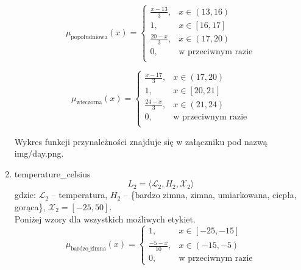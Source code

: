 \documentclass{article}
\begin{document}
\begin{enumerate}
        \begin{equation}
            \mu_{\text{popołudniowa}}(x) =
            \begin{cases}
            \frac{x - 13}{3}, & x \in (13, 16) \\
            1, & x \in [16, 17] \\
            \frac{20 - x}{3}, & x \in (17, 20) \\
            0, & \text{w przeciwnym razie} \\
             \end{cases}
        \end{equation}

        \begin{equation}
            \mu_{\text{wieczorna}}(x) =
            \begin{cases}
            \frac{x - 17}{3}, & x \in (17, 20) \\
            1, & x \in [20, 21] \\
            \frac{24 - x}{3}, & x \in (21, 24) \\
            0, & \text{w przeciwnym razie} \\
            \end{cases}
        \end{equation} 
        
Wykres funkcji przynależności znajduje się w załączniku pod nazwą img/day.png.
    
    \item temperature\_celsius
        \begin{equation}
            L_2 = \langle \mathcal{L}_2, H_2, \mathcal{X}_2 \rangle
        \end{equation}
        gdzie: $\mathcal{L}_2$ – temperatura, $H_2$ – \{bardzo zimna, zimna, umiarkowana, ciepła, gorąca\}, $\mathcal{X}_2 = [-25, 50]$. \\
        Poniżej wzory dla wszystkich możliwych etykiet.
                \begin{equation}
                   \mu_{\text{bardzo\_zimna}}(x) =
                    \begin{cases}
                    1, & x \in [-25, -15] \\
                    \frac{-5 - x}{10}, & x \in (-15, -5) \\
                    0, & \text{w przeciwnym razie}
                    \end{cases}
                \end{equation}
                

\end{enumerate}
\end{document}
